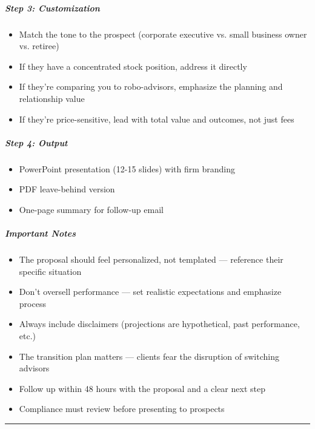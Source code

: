 \documentclass[11pt]{article}
\begin{document}
\subparagraph{Step 3: Customization}\mbox{}\par

\begin{itemize}[leftmargin=*,itemsep=2pt,topsep=2pt]
\item {} Match the tone to the prospect (corporate executive vs. small business owner vs. retiree)
\item {} If they have a concentrated stock position, address it directly
\item {} If they're comparing you to robo-advisors, emphasize the planning and relationship value
\item {} If they're price-sensitive, lead with total value and outcomes, not just fees
\end{itemize}

\subparagraph{Step 4: Output}\mbox{}\par

\begin{itemize}[leftmargin=*,itemsep=2pt,topsep=2pt]
\item {} PowerPoint presentation (12-15 slides) with firm branding
\item {} PDF leave-behind version
\item {} One-page summary for follow-up email
\end{itemize}

\subparagraph{Important Notes}\mbox{}\par

\begin{itemize}[leftmargin=*,itemsep=2pt,topsep=2pt]
\item {} The proposal should feel personalized, not templated — reference their specific situation
\item {} Don't oversell performance — set realistic expectations and emphasize process
\item {} Always include disclaimers (projections are hypothetical, past performance, etc.)
\item {} The transition plan matters — clients fear the disruption of switching advisors
\item {} Follow up within 48 hours with the proposal and a clear next step
\item {} Compliance must review before presenting to prospects
\end{itemize}

\vspace{0.8em}\hrule\vspace{0.8em}
\end{document}
